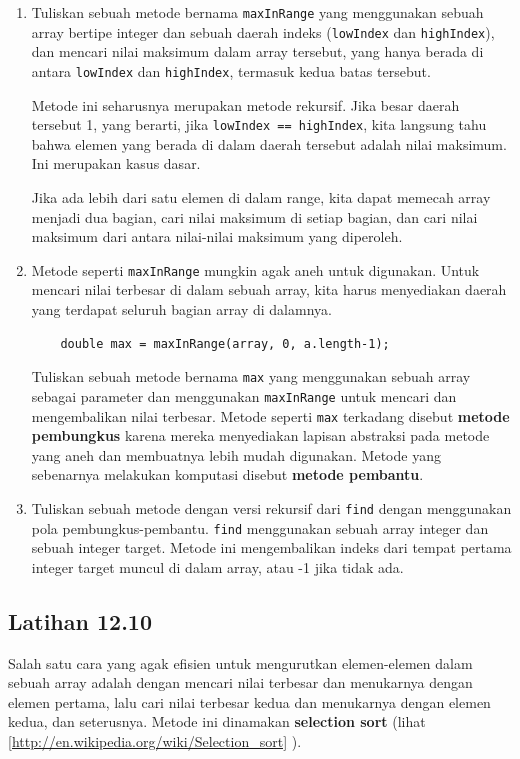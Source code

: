 \begin{enumerate}

\item Tuliskan sebuah metode bernama {\tt maxInRange} yang menggunakan sebuah array bertipe integer dan sebuah daerah indeks ({\tt lowIndex} dan {\tt highIndex}), dan mencari nilai maksimum dalam array tersebut, yang hanya berada di antara {\tt lowIndex} dan {\tt highIndex}, termasuk kedua batas tersebut.

Metode ini seharusnya merupakan metode rekursif. Jika besar daerah tersebut 1, yang berarti, jika {\tt lowIndex == highIndex}, kita langsung tahu bahwa elemen yang berada di dalam daerah tersebut adalah nilai maksimum. Ini merupakan kasus dasar.

Jika ada lebih dari satu elemen di dalam range, kita dapat memecah array menjadi dua bagian, cari nilai maksimum di setiap bagian, dan cari nilai maksimum dari antara nilai-nilai maksimum yang diperoleh.

\item Metode seperti {\tt maxInRange} mungkin agak aneh untuk digunakan.  Untuk mencari nilai terbesar di dalam sebuah array, kita harus menyediakan daerah yang terdapat seluruh bagian array di dalamnya.

\begin{lstlisting}
    double max = maxInRange(array, 0, a.length-1);
\end{lstlisting}

Tuliskan sebuah metode bernama {\tt max} yang menggunakan sebuah array sebagai parameter dan menggunakan {\tt maxInRange} untuk mencari dan mengembalikan nilai terbesar.
Metode seperti {\tt max} terkadang disebut {\bf metode pembungkus}
karena mereka menyediakan lapisan abstraksi pada metode yang aneh dan membuatnya lebih mudah digunakan.  Metode yang sebenarnya melakukan komputasi disebut {\bf metode pembantu}.

\item Tuliskan sebuah metode dengan versi rekursif dari {\tt find} dengan menggunakan pola pembungkus-pembantu.  {\tt find} menggunakan sebuah array integer dan sebuah integer target.  Metode ini mengembalikan indeks dari tempat pertama integer target muncul di dalam array, atau -1 jika tidak ada.

\end{enumerate}


\subsection{Latihan 12.10}
Salah satu cara yang agak efisien untuk mengurutkan elemen-elemen dalam sebuah array adalah dengan mencari nilai terbesar dan menukarnya dengan elemen pertama, lalu cari nilai terbesar kedua dan menukarnya dengan elemen kedua, dan seterusnya.  Metode ini dinamakan {\bf selection
sort} (lihat \ref{http://en.wikipedia.org/wiki/Selection_sort} ).

